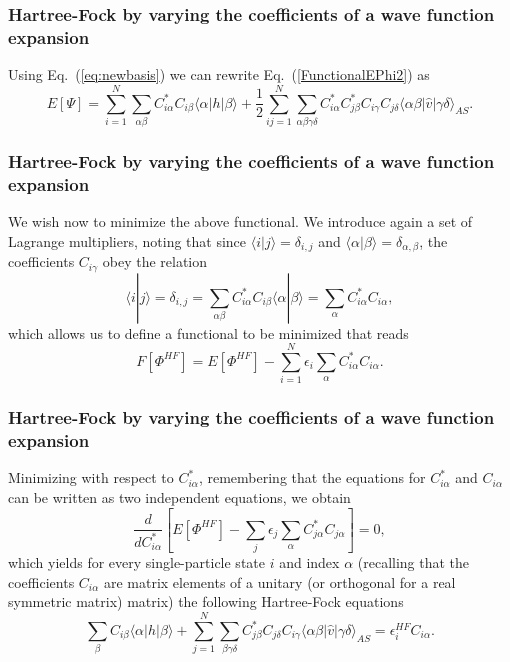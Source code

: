\documentclass{beamer}
\begin{document}
\begin{frame}
\frametitle{Hartree-Fock by varying the coefficients of a wave function expansion}

\begin{block}{}
Using Eq.~(\ref{eq:newbasis}) we can rewrite Eq.~(\ref{FunctionalEPhi2}) as 
\begin{equation}
  E[\Psi] 
  = \sum_{i=1}^N \sum_{\alpha\beta} C^*_{i\alpha}C_{i\beta}\langle \alpha | h | \beta \rangle +
  \frac{1}{2}\sum_{ij=1}^N\sum_{{\alpha\beta\gamma\delta}} C^*_{i\alpha}C^*_{j\beta}C_{i\gamma}C_{j\delta}\langle \alpha\beta|\hat{v}|\gamma\delta\rangle_{AS}. \label{FunctionalEPhi3}
\end{equation}
\end{block}
\end{frame}

\begin{frame}
\frametitle{Hartree-Fock by varying the coefficients of a wave function expansion}

\begin{block}{}
We wish now to minimize the above functional. We introduce again a set of Lagrange multipliers, noting that
since $\langle i | j \rangle = \delta_{i,j}$ and $\langle \alpha | \beta \rangle = \delta_{\alpha,\beta}$, 
the coefficients $C_{i\gamma}$ obey the relation
\[
 \langle i | j \rangle=\delta_{i,j}=\sum_{\alpha\beta} C^*_{i\alpha}C_{i\beta}\langle \alpha | \beta \rangle=
\sum_{\alpha} C^*_{i\alpha}C_{i\alpha},
\]
which allows us to define a functional to be minimized that reads
\begin{equation}
  F[\Phi^{HF}]=E[\Phi^{HF}] - \sum_{i=1}^N\epsilon_i\sum_{\alpha} C^*_{i\alpha}C_{i\alpha}.
\end{equation}
\end{block}
\end{frame}

\begin{frame}
\frametitle{Hartree-Fock by varying the coefficients of a wave function expansion}

\begin{block}{}
Minimizing with respect to $C^*_{i\alpha}$, remembering that the equations for $C^*_{i\alpha}$ and $C_{i\alpha}$
can be written as two  independent equations, we obtain
\[
\frac{d}{dC^*_{i\alpha}}\left[  E[\Phi^{HF}] - \sum_{j}\epsilon_j\sum_{\alpha} C^*_{j\alpha}C_{j\alpha}\right]=0,
\]
which yields for every single-particle state $i$ and index $\alpha$ (recalling that the coefficients $C_{i\alpha}$ are matrix elements of a unitary (or orthogonal for a real symmetric matrix) matrix)
the following Hartree-Fock equations
\[
\sum_{\beta} C_{i\beta}\langle \alpha | h | \beta \rangle+
\sum_{j=1}^N\sum_{\beta\gamma\delta} C^*_{j\beta}C_{j\delta}C_{i\gamma}\langle \alpha\beta|\hat{v}|\gamma\delta\rangle_{AS}=\epsilon_i^{HF}C_{i\alpha}.
\]
\end{block}
\end{frame}
\end{document}
